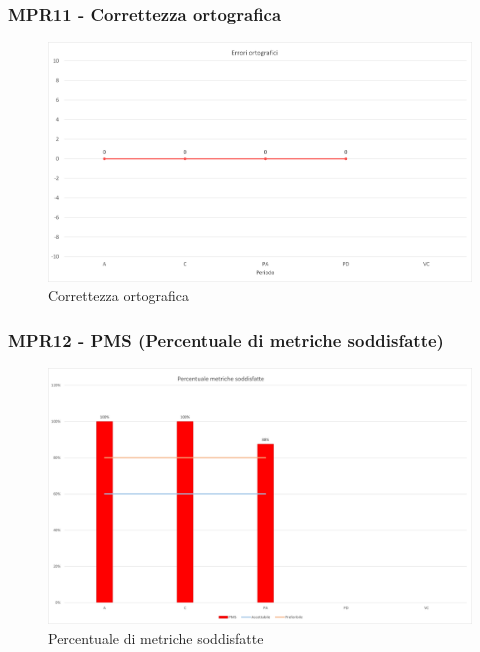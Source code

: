 \subsubsection{MPR11 - Correttezza ortografica}
\begin{figure}[!ht]
    \caption{Correttezza ortografica}
    \vspace{10px}
    \includegraphics[scale=0.5]{sezioni/immagini/CorrettezzaOrtografica.png}
    \centering
\end{figure}
\pagebreak
\subsubsection{MPR12 - PMS (Percentuale di metriche soddisfatte)}
\begin{figure}[!ht]
    \caption{Percentuale di metriche soddisfatte}
    \vspace{10px}
    \includegraphics[scale=0.5]{sezioni/immagini/MetricheSoddisfatte.png}
    \centering
\end{figure}
\newpage